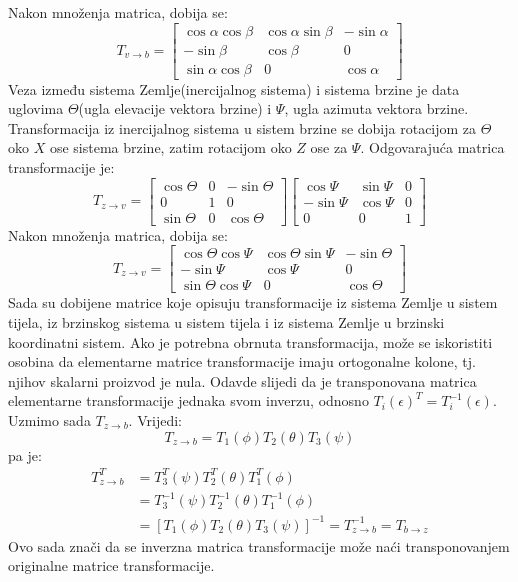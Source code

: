 Nakon množenja matrica, dobija se:
\begin{equation}
    T_{v\to b} = \begin{bmatrix}
        \cos\alpha\cos\beta & \cos\alpha\sin\beta & -\sin\alpha \\
        -\sin\beta & \cos\beta & 0\\
        \sin\alpha\cos\beta & 0 & \cos\alpha
    \end{bmatrix}
    \label{eq:VtoB}
\end{equation}
Veza između sistema Zemlje(inercijalnog sistema) i sistema brzine je data uglovima $\Theta$(ugla elevacije vektora brzine)
i $\Psi$, ugla azimuta vektora brzine. Transformacija iz inercijalnog sistema u sistem brzine se dobija rotacijom 
za $\Theta$ oko $X$ ose sistema brzine, zatim rotacijom oko $Z$ ose za $\Psi$. Odgovarajuća matrica transformacije je:
\begin{equation}
    T_{z\to v} = \begin{bmatrix}
        \cos\Theta & 0 & -\sin\Theta \\
        0& 1& 0\\
        \sin\Theta & 0 & \cos\Theta
    \end{bmatrix}
    \begin{bmatrix}
        \cos\Psi & \sin\Psi & 0\\
        -\sin\Psi & \cos\Psi & 0\\
        0 & 0& 1
        \end{bmatrix}
        \label{eq:ztov}
\end{equation}
Nakon množenja matrica, dobija se:
\begin{equation}
    T_{z\to v} = \begin{bmatrix}
        \cos\Theta\cos\Psi & \cos\Theta\sin\Psi & -\sin\Theta \\
        -\sin\Psi & \cos\Psi & 0\\
        \sin\Theta\cos\Psi & 0 & \cos\Theta
    \end{bmatrix}
\end{equation}
Sada su dobijene matrice koje opisuju transformacije iz sistema Zemlje u sistem tijela, 
iz brzinskog sistema u sistem tijela i iz sistema Zemlje u brzinski koordinatni sistem. 
Ako je potrebna obrnuta transformacija, može se iskoristiti osobina da elementarne matrice transformacije 
imaju ortogonalne kolone, tj. njihov skalarni proizvod je nula. Odavde slijedi 
da je transponovana matrica elementarne transformacije jednaka svom inverzu, odnosno $T_i(\epsilon)^T = T_i^{-1}(\epsilon)$.
Uzmimo sada $T_{z \to b}$. Vrijedi:
\begin{equation*}
    T_{z \to b} = T_1(\phi)T_2(\theta)T_3(\psi)
\end{equation*}
pa je:
\begin{align*}    
    T_{z \to b}^T &= T_3^T(\psi)T_2^T(\theta)T_1^T(\phi)\\ & =  T_3^{-1}(\psi)T_2^{-1}(\theta)T_1^{-1}(\phi)\\
    & = [T_1(\phi)T_2(\theta)T_3(\psi)]^{-1} = T_{z \to b}^{-1} = T_{b\to z}
\end{align*}
Ovo sada znači da se inverzna matrica transformacije može naći transponovanjem originalne matrice 
transformacije. 
